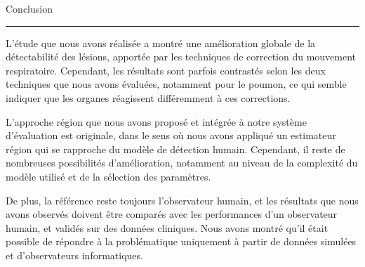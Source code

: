

{\fontsize{30}{100}\selectfont Conclusion}


\rule{15cm}{0.1em}

\vspace{1cm}

\thispagestyle{plain}

L'étude que nous avons réalisée a montré une amélioration globale de la
détectabilité des lésions, apportée par les techniques de correction du
mouvement respiratoire. Cependant, les résultats sont parfois contrastés
selon les deux techniques que nous avons évaluées, notamment
pour le poumon, ce qui semble indiquer que les organes réagissent différemment à
ces corrections.

L'approche région que nous avons proposé et intégrée à notre système d'évaluation est
originale, dans le sens où nous avons appliqué un estimateur région qui se
rapproche du modèle de détection humain. Cependant, il reste de nombreuses
possibilités d'amélioration, notamment au niveau de la complexité du modèle
utilisé et de la sélection des paramètres. 

De plus, la référence reste toujours l'observateur humain, et les résultats que
nous avons observés doivent être comparés avec les performances d'un observateur
humain, et validés sur des données cliniques. Nous avons montré qu'il était
possible de répondre à la problématique uniquement à partir de données simulées
et d'observateurs informatiques.